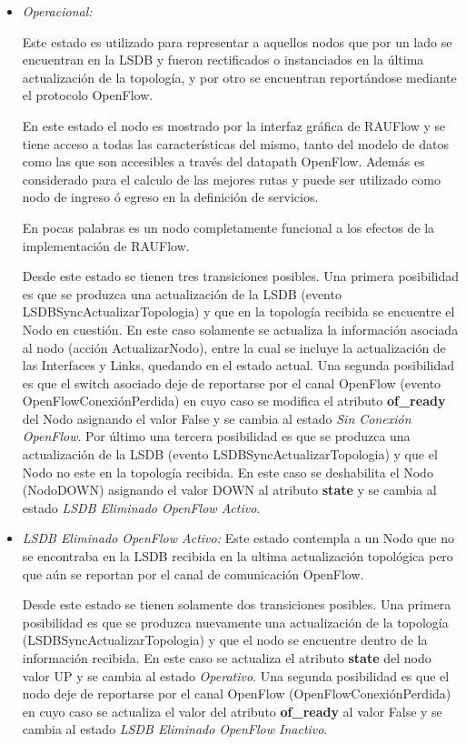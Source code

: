 \begin{itemize}
\item \textit{Operacional:}

Este estado es utilizado para representar a aquellos nodos que por un lado se encuentran en la LSDB y fueron rectificados o instanciados en la \'ultima actualizaci\'on de la topolog\'ia, y por otro se encuentran report\'andose mediante el protocolo OpenFlow.

En este estado el nodo es mostrado por la interfaz gr\'afica de RAUFlow y se tiene acceso a todas las características del mismo, tanto del modelo de datos como las que son accesibles a trav\'es del datapath OpenFlow. Adem\'as es considerado para el calculo de las mejores rutas y puede ser utilizado como nodo de ingreso \'o egreso en la definici\'on de servicios.

En pocas palabras es un nodo completamente funcional a los efectos de la implementaci\'on de RAUFlow.

Desde este estado se tienen tres transiciones posibles. Una primera posibilidad es que se produzca una actualización de la LSDB (evento LSDBSyncActualizarTopologia) y que en la topolog\'ia recibida se encuentre el Nodo en cuesti\'on. En este caso solamente se actualiza la informaci\'on asociada al nodo (acción ActualizarNodo), entre la cual se incluye la actualización de las Interfaces y Links, quedando en el estado actual. Una segunda posibilidad es que el switch asociado deje de reportarse por el canal OpenFlow (evento OpenFlowConexiónPerdida) en cuyo caso se modifica el atributo \textbf{of\_ready} del Nodo asignando el valor False y se cambia al estado \textit{Sin Conexión OpenFlow}. Por \'ultimo una tercera posibilidad es que se produzca una actualizaci\'on de la LSDB (evento LSDBSyncActualizarTopologia) y que el Nodo no este en la topolog\'ia recibida. En este caso se deshabilita el Nodo (NodoDOWN) asignando el valor DOWN al atributo \textbf{state} y se cambia al estado \textit{LSDB Eliminado OpenFlow Activo}.

\item \textit{LSDB Eliminado OpenFlow Activo:} Este estado contempla a un Nodo que no se encontraba en la LSDB recibida en la ultima actualizaci\'on topol\'ogica pero que a\'un se reportan por el canal de comunicaci\'on OpenFlow.

Desde este estado se tienen solamente dos transiciones posibles. Una primera posibilidad es que se produzca nuevamente una actualización de la topolog\'ia 
 (LSDBSyncActualizarTopologia) y que el nodo se encuentre dentro de la información recibida. En este caso se actualiza el atributo \textbf{state} del nodo valor UP y se cambia al estado \textit{Operativo}. Una segunda posibilidad es que el nodo deje de reportarse por el canal OpenFlow (OpenFlowConexiónPerdida) en cuyo caso se actualiza el valor del atributo \textbf{of\_ready} al valor False y se cambia al estado \textit{LSDB Eliminado OpenFlow Inactivo}.


\end{itemize}
